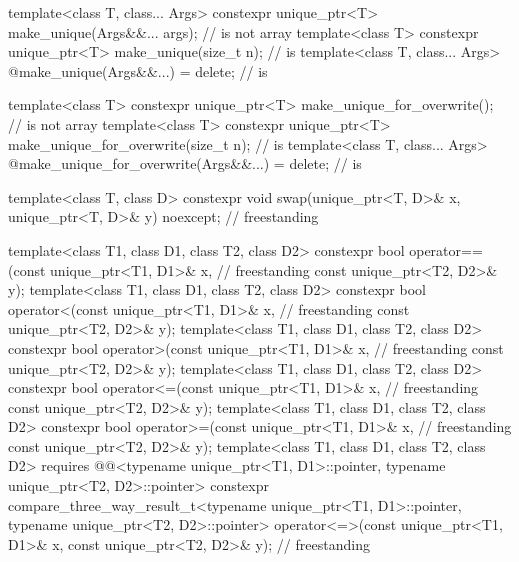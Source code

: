 \begin{codeblock}
{  template<class T, class... Args>
    constexpr unique_ptr<T> make_unique(Args&&... args);                        //  is not array
  template<class T>
    constexpr unique_ptr<T> make_unique(size_t n);                              //  is 
  template<class T, class... Args>
    @\unspecnc@ make_unique(Args&&...) = delete;                                //  is 

  template<class T>
    constexpr unique_ptr<T> make_unique_for_overwrite();                        //  is not array
  template<class T>
    constexpr unique_ptr<T> make_unique_for_overwrite(size_t n);                //  is 
  template<class T, class... Args>
    @\unspecnc@ make_unique_for_overwrite(Args&&...) = delete;                  //  is 

  template<class T, class D>
    constexpr void swap(unique_ptr<T, D>& x, unique_ptr<T, D>& y) noexcept;         // freestanding

  template<class T1, class D1, class T2, class D2>
    constexpr bool operator==(const unique_ptr<T1, D1>& x,                          // freestanding
                              const unique_ptr<T2, D2>& y);
  template<class T1, class D1, class T2, class D2>
    constexpr bool operator<(const unique_ptr<T1, D1>& x,                           // freestanding
                             const unique_ptr<T2, D2>& y);
  template<class T1, class D1, class T2, class D2>
    constexpr bool operator>(const unique_ptr<T1, D1>& x,                           // freestanding
                             const unique_ptr<T2, D2>& y);
  template<class T1, class D1, class T2, class D2>
    constexpr bool operator<=(const unique_ptr<T1, D1>& x,                          // freestanding
                              const unique_ptr<T2, D2>& y);
  template<class T1, class D1, class T2, class D2>
    constexpr bool operator>=(const unique_ptr<T1, D1>& x,                          // freestanding
                              const unique_ptr<T2, D2>& y);
  template<class T1, class D1, class T2, class D2>
    requires @@<typename unique_ptr<T1, D1>::pointer,
                                       typename unique_ptr<T2, D2>::pointer>
    constexpr compare_three_way_result_t<typename unique_ptr<T1, D1>::pointer,
                                         typename unique_ptr<T2, D2>::pointer>
      operator<=>(const unique_ptr<T1, D1>& x, const unique_ptr<T2, D2>& y);        // freestanding

}
\end{codeblock}
